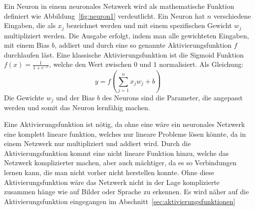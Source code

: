 \documentclass[12pt,a4paper]{report}
\begin{document}
Ein Neuron in einem neuronales Netzwerk wird als mathematische Funktion definiert wie Abbildung~\ref{fig:neuron1}
verdeutlicht.
Ein Neuron hat $n$ verschiedene Eingaben, die als $x_j$ bezeichnet werden und mit einem spezifischen Gewicht $w_j$ multipliziert werden.
Die Ausgabe erfolgt, indem man alle gewichteten Eingaben, mit einem Bias $b$, addiert und durch eine so genannte
Aktivierungsfunktion $f$ durchlaufen läst.
Eine klassische Aktivierungsfunktion ist die Sigmoid Funktion $f(x) = \frac{1}{1 + e^{-x}}$, welche den Wert zwischen 0 und 1 normalisiert.
Als Gleichung:
\[y =f\left(\sum_{j=1}^{n} x_j w_j + b\right)\]
Die Gewichte $w_j$ und der Bias $b$ des Neurons sind die Parameter, die angepasst werden und somit das Neuron lernfähig machen.

Eine Aktivierungsfunktion ist nötig, da ohne eine wäre ein neuronales Netzwerk eine komplett lineare funktion, welches
nur lineare Probleme lösen könnte\cite{activations}, da in einem Netzwerk nur multipliziert und addiert wird.
Durch die Aktivierungsfunktion kommt eine nicht lineare Funktion hinzu, welche das Netzwerk komplizierter machen,
aber auch mächtiger, da es so Verbindungen lernen kann, die man nicht vorher nicht herstellen konnte.
Ohne diese Aktivierungsfunktion wäre das Netzwerk nicht in der Lage komplizierte zusammen hänge wie auf Bilder oder Sprache zu erkennen.\cite{activations}
Es wird näher auf die Aktivierungsfunktion eingegangen im Abschnitt~\ref{sec:aktivierungsfunktionen}
\end{document}
